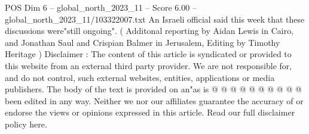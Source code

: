 \begin{textsample}{POS Dim 6 – global\_north\_2023\_11 – Score 6.00 – global\_north\_2023\_11/103322007.txt}
An Israeli official said this week that these discussions were"still ongoing". ( Additonal reporting by Aidan Lewis in Cairo, and Jonathan Saul and Crispian Balmer in Jerusalem, Editing by Timothy Heritage ) Disclaimer : The content of this article is syndicated or provided to this website from an external third party provider.
We are not responsible for, and do not control, such external websites, entities, applications or media publishers.
The body of the text is provided on an"as is @ @ @ @ @ @ @ @ @ @ been edited in any way.
Neither we nor our affiliates guarantee the accuracy of or endorse the views or opinions expressed in this article.
Read our full disclaimer policy here.

\end{textsample}
